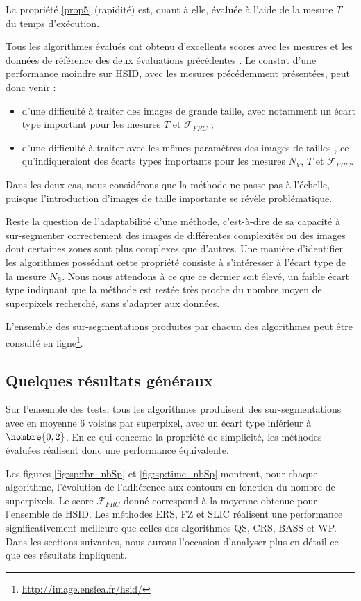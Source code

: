 La propriété \ref{prop5} (rapidité) est, quant à elle, évaluée à l'aide de la mesure $T$ du temps d’exécution.

Tous les algorithmes évalués ont obtenu d'excellents scores avec les mesures et les données de référence des deux évaluations précédentes \cite{achanta2012slic,stutz2015superpixel}. Le constat d'une performance moindre sur HSID, avec les mesures précédemment présentées, peut donc venir :
\begin{itemize}
\item d'une difficulté à traiter des images de grande taille, avec notamment un écart type important pour les mesures $T$ et $\mathcal{F}_{FRC}$ ;
\item d'une difficulté à traiter avec les mêmes paramètres des images de tailles , ce qu'indiqueraient des écarts types importants pour les mesures $N_{V}$, $T$ et $\mathcal{F}_{FRC}$.
\end{itemize}

Dans les deux cas, nous considérons que la méthode ne passe pas à l'échelle, puisque l'introduction d'images de taille importante se révèle problématique. 

Reste la question de l'adaptabilité d'une méthode, c'est-à-dire de sa capacité à sur-segmenter correctement des images de différentes complexités ou des images dont certaines zones sont plus complexes que d'autres. Une manière d'identifier les algorithmes possédant cette propriété consiste à s'intéresser à l'écart type de la mesure $N_{\mathbb{S}}$. Nous nous attendons à ce que ce dernier soit élevé, un faible écart type indiquant que la méthode est restée très proche du nombre moyen de superpixels recherché, sans s'adapter aux données.

L'ensemble des sur-segmentations produites par chacun des algorithmes peut être consulté en ligne\footnote{\url{http://image.ensfea.fr/hsid/}}.

\subsection{Quelques résultats généraux}

Sur l'ensemble des tests, tous les algorithmes produisent des sur-segmentations avec en moyenne $6$ voisins par superpixel, avec un écart type inférieur à $\nombre{0,2}$. En ce qui concerne la propriété de simplicité, les méthodes évaluées réalisent donc une performance équivalente.

Les figures \ref{fig:sp:fbr_nbSp} et \ref{fig:sp:time_nbSp} montrent, pour chaque algorithme, l’évolution de l'adhérence aux contours en fonction du nombre de superpixels.  Le score $\mathcal{F}_{FRC}$ donné correspond à la moyenne obtenue pour l'ensemble de HSID. Les méthodes ERS, FZ et SLIC réalisent une performance significativement meilleure que celles des algorithmes QS, CRS, BASS et WP. Dans les sections suivantes, nous aurons l'occasion d'analyser plus en détail ce que ces résultats impliquent. 


